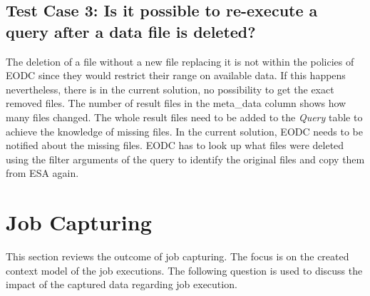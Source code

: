 \documentclass[draft,final]{vutinfth} %
\begin{document}
\subsection{Test Case 3: Is it possible to re-execute a query after a data file is deleted?}
The deletion of a file without a new file replacing it is not within the policies of EODC since they would restrict their range on available data. If this happens nevertheless, there is in the current solution, no possibility to get the exact removed files. The number of result files in the meta\_data column shows how many files changed. The whole result files need to be added to the \textit{Query} table to achieve the knowledge of missing files. In the current solution, EODC needs to be notified about the missing files. EODC has to look up what files were deleted using the filter arguments of the query to identify the original files and copy them from ESA again. 


\section{Job Capturing}\label{Evaluation:special_jobcap}

This section reviews the outcome of job capturing. The focus is on the created context model of the job executions. The following question is used to discuss the impact of the captured data regarding job execution.
  \\
\end{document}
